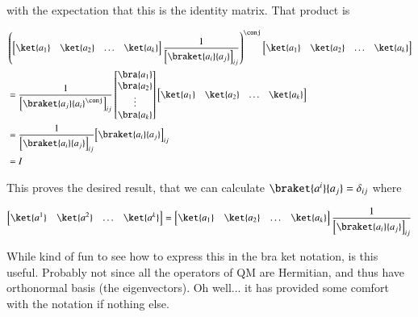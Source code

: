 with the expectation that this is the identity matrix.  That product is

\begin{align*}
&\left(
\begin{bmatrix}
\ket{a_1} & \ket{a_2} & \hdots & \ket{a_k}
\end{bmatrix}
\inv{{\begin{bmatrix}
\braket{a_i}{a_j}
\end{bmatrix}}_{ij}} \right)^\conj
\begin{bmatrix}
\ket{a_1} & \ket{a_2} & \hdots & \ket{a_k}
\end{bmatrix} \\
&=
\inv{{\begin{bmatrix}
\braket{a_j}{a_i}^\conj
\end{bmatrix}}_{ij}} 
\begin{bmatrix}
\bra{a_1} \\ \bra{a_2} \\ \vdots \\ \bra{a_k}
\end{bmatrix}
\begin{bmatrix}
\ket{a_1} & \ket{a_2} & \hdots & \ket{a_k}
\end{bmatrix} \\
&=
\inv{{\begin{bmatrix}
\braket{a_i}{a_j}
\end{bmatrix}}_{ij}} 
{{\begin{bmatrix}
\braket{a_i}{a_j}
\end{bmatrix}}_{ij}} \\
&= I
\end{align*}

This proves the desired result, that we can calculate $\braket{a^i}{a_j} = \delta_{ij}$ where 

\begin{align*}
\begin{bmatrix}
\ket{a^1} & \ket{a^2} & \hdots & \ket{a^k}
\end{bmatrix} = 
\begin{bmatrix}
\ket{a_1} & \ket{a_2} & \hdots & \ket{a_k}
\end{bmatrix}
\inv{{\begin{bmatrix}
\braket{a_i}{a_j}
\end{bmatrix}}_{ij}}
\end{align*}

While kind of fun to see how to express this in the bra ket notation, is this useful.  Probably not since
all the operators of QM are Hermitian, and thus have orthonormal basis (the eigenvectors).  Oh well... it has
provided some comfort with the notation if nothing else.


